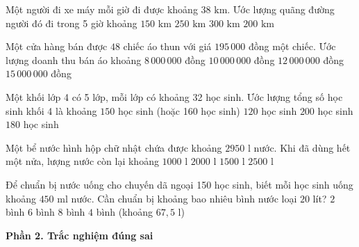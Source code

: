 \begin{ex} %
Một người đi xe máy mỗi giờ đi được khoảng $38\text{ km}$. Ước lượng quãng đường người đó đi trong 5 giờ khoảng
\choice
{$150\text{ km}$}
{$250\text{ km}$}
{$300\text{ km}$}
{\True $200\text{ km}$}
\end{ex}

\begin{ex} %
Một cửa hàng bán được $48$ chiếc áo thun với giá $195\,000$ đồng một chiếc. Ước lượng doanh thu bán áo khoảng
\choice
{$8\,000\,000$ đồng}
{\True $10\,000\,000$ đồng}
{$12\,000\,000$ đồng}
{$15\,000\,000$ đồng}
\end{ex}

\begin{ex} %
Một khối lớp 4 có 5 lớp, mỗi lớp có khoảng 32 học sinh. Ước lượng tổng số học sinh khối 4 là khoảng
\choice
{\True $150$ học sinh (hoặc 160 học sinh)}
{$120$ học sinh}
{$200$ học sinh}
{$180$ học sinh}
\end{ex}

\begin{ex} %
Một bể nước hình hộp chữ nhật chứa được khoảng $2950\text{ l}$ nước. Khi đã dùng hết một nửa, lượng nước còn lại khoảng
\choice
{$1000\text{ l}$}
{$2000\text{ l}$}
{\True $1500\text{ l}$}
{$2500\text{ l}$}
\end{ex}

\begin{ex} %
Để chuẩn bị nước uống cho chuyến dã ngoại 150 học sinh, biết mỗi học sinh uống khoảng $450\text{ ml}$ nước. Cần chuẩn bị khoảng bao nhiêu bình nước loại $20$ lít?
\choice
{$2$ bình}
{$6$ bình}
{$8$ bình}
{\True $4$ bình (khoảng $67{,}5\text{ l}$)}
\end{ex}

\textbf{Phần 2. Trắc nghiệm đúng sai}

